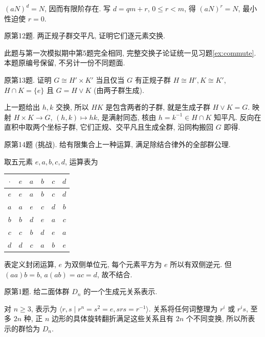\begin{solution}
$(aN)^d=N$, 因而有限阶存在. 写 $d=qm+r$, $0\le r<m$, 得 $(aN)^r=N$, 最小性迫使 $r=0$.
\end{solution}
\begin{exercise}原第12题. 两正规子群交平凡, 证明它们逐元素交换.\end{exercise}
\begin{solution}
此题与第一次模拟期中第5题完全相同, 完整交换子论证统一见习题\ref{ex:commute}. 本题原编号保留, 不另计一份不同题面.
\end{solution}
\begin{exercise}原第13题. 证明 $G\cong H'\times K'$ 当且仅当 $G$ 有正规子群 $H\cong H',K\cong K'$, $H\cap K=\{e\}$ 且 $G=H\vee K$ (由两子群生成).\end{exercise}
\begin{solution}
上一题给出 $h,k$ 交换, 所以 $HK$ 是包含两者的子群, 就是生成子群 $H\vee K=G$. 映射 $H\times K\to G$, $(h,k)\mapsto hk$, 是满射同态, 核由 $h=k^{-1}\in H\cap K$ 知平凡. 反向在直积中取两个坐标子群, 它们正规、交平凡且生成全群, 沿同构搬回 $G$ 即得.
\end{solution}
\begin{exercise}原第14题 (挑战). 给有限集合上一种运算, 满足除结合律外的全部群公理.\end{exercise}
\begin{solution}
取五元素 $e,a,b,c,d$, 运算表为
\begin{center}\begin{tabular}{c|ccccc}
$\cdot$&$e$&$a$&$b$&$c$&$d$\\\hline
$e$&$e$&$a$&$b$&$c$&$d$\\
$a$&$a$&$e$&$c$&$d$&$b$\\
$b$&$b$&$d$&$e$&$a$&$c$\\
$c$&$c$&$b$&$d$&$e$&$a$\\
$d$&$d$&$c$&$a$&$b$&$e$
\end{tabular}\end{center}
表定义封闭运算, $e$ 为双侧单位元, 每个元素平方为 $e$ 所以有双侧逆元. 但 $(aa)b=b$, $a(ab)=ac=d$, 故不结合.
\end{solution}
\begin{exercise}原第1题. 给二面体群 $D_n$ 的一个生成元关系表示.\end{exercise}
\begin{solution}
对 $n\ge3$, 表示为 $\langle r,s\mid r^n=s^2=e,srs=r^{-1}\rangle$. 关系将任何词整理为 $r^i$ 或 $r^is$, 至多 $2n$ 种, 正 $n$ 边形的具体旋转翻折满足这些关系且有 $2n$ 个不同变换, 所以所表示的群恰为 $D_n$.
\end{solution}
